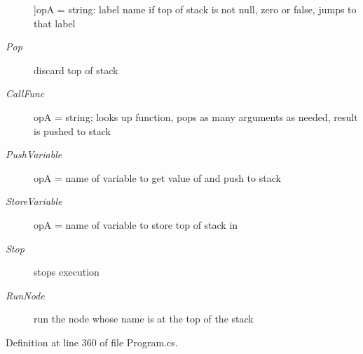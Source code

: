 \begin{Desc}
\begin{description}
{}]op\-A = string\-: label name if top of stack is not null, zero or false, jumps to that label \item[{\em 
\hypertarget{a00045_ad5dfb6ee68ca7469623ad3e459f98894a0ae61bd0474e04c9f1195d4baa0213a0}{Pop}\label{a00045_ad5dfb6ee68ca7469623ad3e459f98894a0ae61bd0474e04c9f1195d4baa0213a0}
}]discard top of stack \item[{\em 
\hypertarget{a00045_ad5dfb6ee68ca7469623ad3e459f98894a3b5e7e8300dc6e4b78cb865c5b10f01a}{Call\-Func}\label{a00045_ad5dfb6ee68ca7469623ad3e459f98894a3b5e7e8300dc6e4b78cb865c5b10f01a}
}]op\-A = string; looks up function, pops as many arguments as needed, result is pushed to stack \item[{\em 
\hypertarget{a00045_ad5dfb6ee68ca7469623ad3e459f98894ab8c46f65015a178516fadbb5ad6c2038}{Push\-Variable}\label{a00045_ad5dfb6ee68ca7469623ad3e459f98894ab8c46f65015a178516fadbb5ad6c2038}
}]op\-A = name of variable to get value of and push to stack \item[{\em 
\hypertarget{a00045_ad5dfb6ee68ca7469623ad3e459f98894a872dc050abaff4beb46e70dadd4088c2}{Store\-Variable}\label{a00045_ad5dfb6ee68ca7469623ad3e459f98894a872dc050abaff4beb46e70dadd4088c2}
}]op\-A = name of variable to store top of stack in \item[{\em 
\hypertarget{a00045_ad5dfb6ee68ca7469623ad3e459f98894a11a755d598c0c417f9a36758c3da7481}{Stop}\label{a00045_ad5dfb6ee68ca7469623ad3e459f98894a11a755d598c0c417f9a36758c3da7481}
}]stops execution \item[{\em 
\hypertarget{a00045_ad5dfb6ee68ca7469623ad3e459f98894ae956bcf888278c168ee9b106927ff6ac}{Run\-Node}\label{a00045_ad5dfb6ee68ca7469623ad3e459f98894ae956bcf888278c168ee9b106927ff6ac}
}]run the node whose name is at the top of the stack \end{description}
\end{Desc}


Definition at line 360 of file Program.\-cs.



